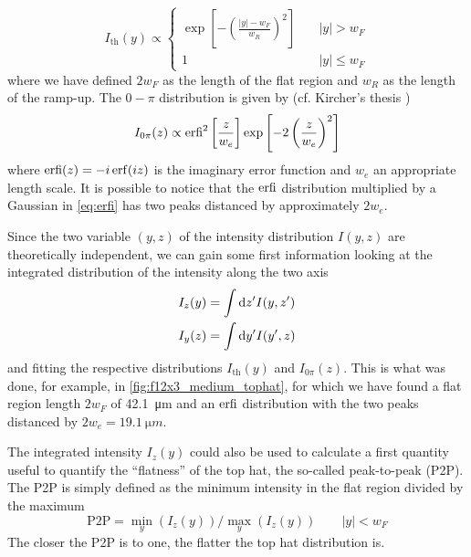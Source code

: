 \begin{equation}
    I_\text{th}(y) \propto
    \begin{cases}
        \exp\left[-\left(\frac{\left|y\right|-w_F}{w_R}\right)^2\right] & \quad |y| > w_F    \\
        1                                                               & \quad |y| \leq w_F
    \end{cases}
\end{equation}
where we have defined $2w_F$ as the length of the flat region and $w_R$ as the length of the ramp-up. The $0-\pi$ distribution is given by (cf. Kircher's thesis \cite{krinner2015})
\begin{equation}
    \label{eq:erfi}
    I_{0\pi}(z) \propto  \text{erfi}^2\left[\frac{z}{w_e}\right] \exp\left[-2 \left(\frac{z}{w_e}\right)^2\right]
\end{equation}
where $\erfi(z) = -i\erf(iz)$ is the imaginary error function and $w_e$ an appropriate length scale. It is possible to notice that the $\text{erfi}$ distribution multiplied by a Gaussian in \cref{eq:erfi} has two peaks distanced by approximately $2w_e$.

Since the two variable $(y,z)$ of the intensity distribution $I(y,z)$ are theoretically independent, we can gain some first information looking at the integrated distribution of the intensity along the two axis
\begin{align}
    I_z(y) & = \int \differential z' I(y,z') \\
    I_y(z) & = \int \differential y' I(y',z)
\end{align}
and fitting the respective distributions $I_\text{th}(y)$ and $I_{0\pi}(z)$. This is what was done, for example, in \cref{fig:f12x3_medium_tophat}, for which we have found a flat region length $2w_F$ of \SI{42.1}{\micro m} and an $\text{erfi}$ distribution with the two peaks distanced by $2w_e = \SI{19.1}{\micro m}$.

The integrated intensity $I_z(y)$ could also be used to calculate a first quantity useful to quantify the \enquote{flatness} of the top hat, the so-called peak-to-peak (P2P). The P2P is simply defined as the minimum intensity in the flat region divided by the maximum
\begin{equation}
    \label{eq:p2p}
    \text{P2P} = \min_y(I_z(y)) / \max_y(I_z(y)) \qquad |y| < w_F
\end{equation}
The closer the P2P is to one, the flatter the top hat distribution is.

